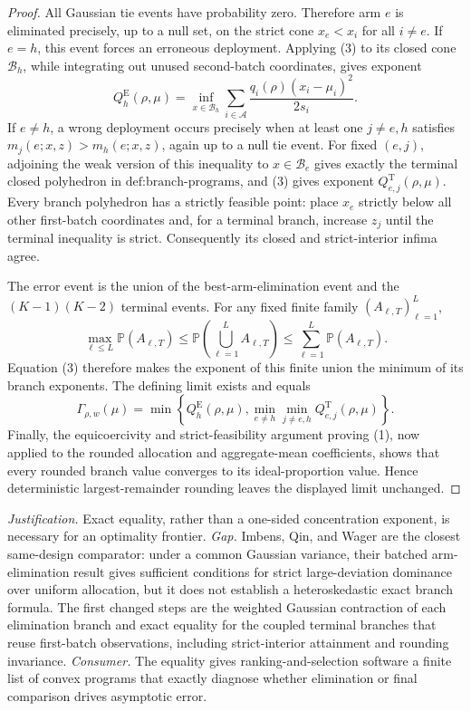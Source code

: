 \documentclass{article}
\begin{document}
\begin{proof}
All Gaussian tie events have probability zero. Therefore arm \(e\) is eliminated precisely, up to a null set, on the strict cone \(x_e<x_i\) for all \(i\ne e\). If \(e=h\), this event forces an erroneous deployment. Applying (3) to its closed cone \(\mathcal B_h\), while integrating out unused second-batch coordinates, gives exponent
\[
 Q_h^{\mathrm E}(\rho,\mu)
 =\inf_{x\in\mathcal B_h}
 \sum_{i\in\mathcal A}\frac{q_i(\rho)(x_i-\mu_i)^2}{2s_i}.
\]
If \(e\ne h\), a wrong deployment occurs precisely when at least one \(j\ne e,h\) satisfies \(m_j(e;x,z)>m_h(e;x,z)\), again up to a null tie event. For fixed \((e,j)\), adjoining the weak version of this inequality to \(x\in\mathcal B_e\) gives exactly the terminal closed polyhedron in \(\text{def:branch-programs}\), and (3) gives exponent \(Q_{e,j}^{\mathrm T}(\rho,\mu)\). Every branch polyhedron has a strictly feasible point: place \(x_e\) strictly below all other first-batch coordinates and, for a terminal branch, increase \(z_j\) until the terminal inequality is strict. Consequently its closed and strict-interior infima agree.

The error event is the union of the best-arm-elimination event and the \((K-1)(K-2)\) terminal events. For any fixed finite family \((A_{\ell,T})_{\ell=1}^L\),
\[
 \max_{\ell\leq L}\mathbb P(A_{\ell,T})
 \leq \mathbb P\!\left(\bigcup_{\ell=1}^L A_{\ell,T}\right)
 \leq \sum_{\ell=1}^L\mathbb P(A_{\ell,T}).
\]
Equation (3) therefore makes the exponent of this finite union the minimum of its branch exponents. The defining limit exists and equals
\[
 \Gamma_{\rho,w}(\mu)
 =\min\left\{Q_h^{\mathrm E}(\rho,\mu),
 \min_{e\ne h}\min_{j\ne e,h}Q_{e,j}^{\mathrm T}(\rho,\mu)\right\}.
\]
Finally, the equicoercivity and strict-feasibility argument proving (1), now applied to the rounded allocation and aggregate-mean coefficients, shows that every rounded branch value converges to its ideal-proportion value. Hence deterministic largest-remainder rounding leaves the displayed limit unchanged.
\end{proof}
\par\smallskip\noindent \textit{Justification.} Exact equality, rather than a one-sided concentration exponent, is necessary for an optimality frontier. \textit{Gap.} Imbens, Qin, and Wager are the closest same-design comparator: under a common Gaussian variance, their batched arm-elimination result gives sufficient conditions for strict large-deviation dominance over uniform allocation, but it does not establish a heteroskedastic exact branch formula. The first changed steps are the weighted Gaussian contraction of each elimination branch and exact equality for the coupled terminal branches that reuse first-batch observations, including strict-interior attainment and rounding invariance. \textit{Consumer.} The equality gives ranking-and-selection software a finite list of convex programs that exactly diagnose whether elimination or final comparison drives asymptotic error.
\end{document}
